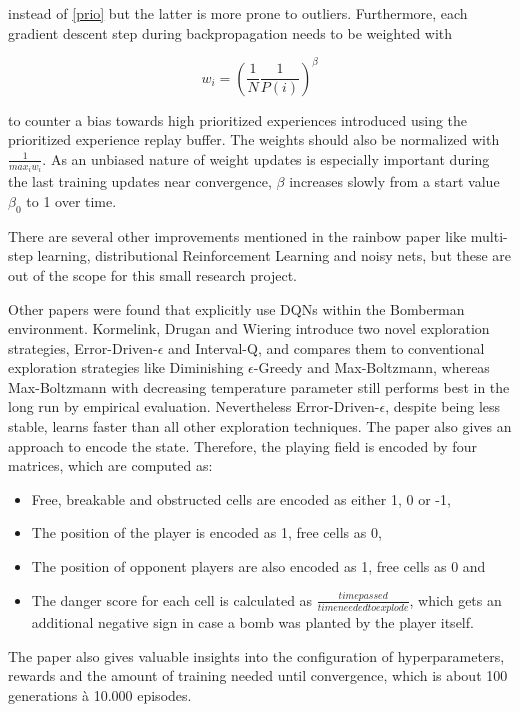 instead of \ref{prio} but the latter is more prone to outliers. Furthermore, each gradient descent step during backpropagation needs to be weighted with 

\begin{equation} \label{weight}
	w_i = ( \frac{1}{N} \frac{1}{P(i)} )^\beta
\end{equation}

to counter a bias towards high prioritized experiences introduced using the prioritized experience replay buffer. The weights should also be normalized with $\frac{1}{max_i w_i}$. As an unbiased nature of weight updates is especially important during the last training updates near convergence, $\beta$ increases slowly from a start value $\beta_0$ to 1 over time. 

There are several other improvements mentioned in the rainbow paper \cite{Hessel2017} like multi-step learning, distributional Reinforcement Learning and noisy nets, but these are out of the scope for this small research project. 

Other papers were found that explicitly use DQNs within the Bomberman environment. Kormelink, Drugan and Wiering \cite{Kormelink2018} introduce two novel exploration strategies, Error-Driven-$\epsilon$ and Interval-Q, and compares them to conventional exploration strategies like Diminishing $\epsilon$-Greedy and Max-Boltzmann, whereas Max-Boltzmann with decreasing temperature parameter still performs best in the long run by empirical evaluation. Nevertheless Error-Driven-$\epsilon$, despite being less stable, learns faster than all other exploration techniques. The paper also gives an approach to encode the state. Therefore, the playing field is encoded by four matrices, which are computed as:

\begin{itemize}
	\item Free, breakable and obstructed cells are encoded as either 1, 0 or -1,
	\item The position of the player is encoded as 1, free cells as 0,
	\item The position of opponent players are also encoded as 1, free cells as 0 and
	\item The danger score for each cell is calculated as $\frac{time passed}{time needed to explode}$, which gets an additional negative sign in case a bomb was planted by the player itself.
\end{itemize}

The paper also gives valuable insights into the configuration of hyperparameters, rewards and the amount of training needed until convergence, which is about 100 generations à 10.000 episodes. 

